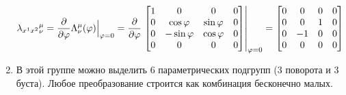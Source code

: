 \begin{enumerate}
  $$
    \lambda_{x^1 x^2} {}_{\nu}^{\mu} =\dfrac{\partial}{\partial \varphi} \Lambda_{\nu}^{\mu} (\varphi) \Big|_{\varphi = 0}
    = \dfrac{\partial}{\partial \varphi} \left.\begin{bmatrix}
        1 & 0 & 0 & 0 \\
        0 & \cos \varphi & \sin \varphi & 0 \\
        0 & -\sin \varphi & \cos \varphi & 0 \\
        0  & 0 & 0 & 0 \\
      \end{bmatrix} \right|_{\varphi = 0} = \begin{bmatrix}
                                           0 & 0 & 0 & 0 \\
                                           0 & 0 & 1 & 0 \\
                                           0 & -1 & 0 & 0  \\
                                           0 & 0 & 0 & 0 \\
                                         \end{bmatrix}
  $$
  \item   В этой группе можно выделить 6 параметрических подгрупп (3 поворота и 3 буста). Любое преобразование строится как комбинация бесконечно малых.
\end{enumerate}

